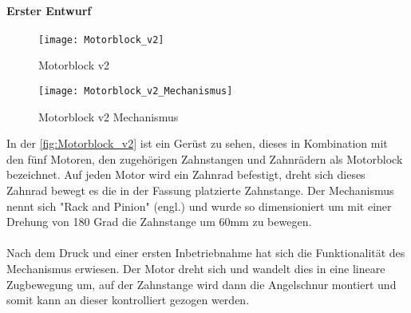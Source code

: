 \documentclass[titlepage,12pt,twoside]{article}
\begin{document}
\paragraph{Erster Entwurf}
\hfill \break
\hfill \break
\begin{figure}[H]
	\begin{center}
		\scalebox{1.2}
		{\texttt{[image: Motorblock\_v2]}}
		\caption{Motorblock v2}
		\label{fig:Motorblock_v2}			
	\end{center}
\end{figure}
\begin{figure}[H]
	\begin{center}
		\scalebox{1.2}
		{\texttt{[image: Motorblock\_v2\_Mechanismus]}}
		\caption{Motorblock v2 Mechanismus}
		\label{fig:Motorblock_v2}			
	\end{center}
\end{figure}
\hfill \break
In der \autoref{fig:Motorblock_v2} ist ein Gerüst zu sehen, dieses in Kombination mit den fünf Motoren, den zugehörigen Zahnstangen und Zahnrädern als Motorblock bezeichnet. Auf jeden Motor wird ein Zahnrad befestigt, dreht sich dieses Zahnrad bewegt es die 
in der Fassung platzierte Zahnstange. Der Mechanismus nennt sich "Rack and Pinion" (engl.) und wurde so dimensioniert um mit einer Drehung von 180 Grad die Zahnstange um 60mm zu bewegen. \\
\\
Nach dem Druck und einer ersten Inbetriebnahme hat sich die Funktionalität des Mechanismus erwiesen. Der Motor dreht sich und wandelt dies in eine lineare Zugbewegung um, auf der Zahnstange wird dann die Angelschnur montiert und somit kann an 
dieser kontrolliert gezogen werden. \\
\\
\end{document}
